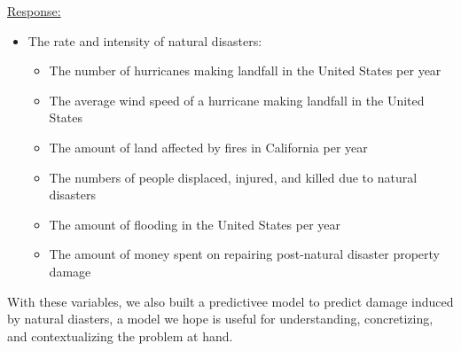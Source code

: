 \documentclass[10pt,]{article}
\begin{document}
\underline{Response:}

\begin{itemize}
  \item The rate and intensity of natural disasters:
  \begin{itemize}
    \item The number of hurricanes making landfall in the United States per year
    \item The average wind speed of a hurricane making landfall in the United States
    \item The amount of land affected by fires in California per year
    \item The numbers of people displaced, injured, and killed due to natural disasters
    \item The amount of flooding in the United States per year
    \item The amount of money spent on repairing post-natural disaster property damage
  \end{itemize}
\end{itemize}

With these variables, we also built a predictivee model to predict
damage induced by natural diasters, a model we hope is useful for
understanding, concretizing, and contextualizing the problem at hand.
\end{document}
